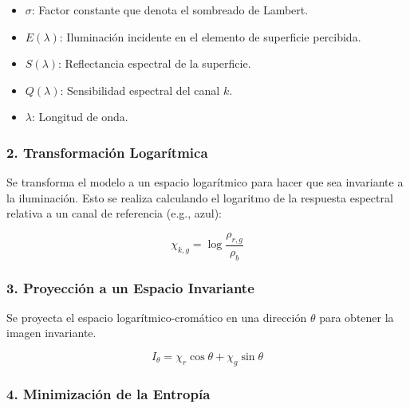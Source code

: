 \begin{itemize}
\setlength{\itemsep}{-1ex}
   \item{\begin{flushleft} $\sigma$: Factor constante que denota el sombreado de Lambert. \end{flushleft}}
   \item{\begin{flushleft} $E(\lambda )$: Iluminación incidente en el elemento de superficie percibida. \end{flushleft}}
   \item{\begin{flushleft} $S(\lambda )$: Reflectancia espectral de la superficie. \end{flushleft}}
   \item{\begin{flushleft} $Q(\lambda )$: Sensibilidad espectral del canal $k$. \end{flushleft}}
   \item{\begin{flushleft} $\lambda$: Longitud de onda. \end{flushleft}}
\end{itemize}

\subsubsection{2. Transformación Logarítmica}

Se transforma el modelo a un espacio logarítmico para hacer que sea invariante a la iluminación. Esto se realiza calculando el logaritmo de la respuesta espectral relativa a un canal de referencia (e.g., azul):

$$\chi_{k,g} =\log \frac{\rho_{r,g} }{\rho_b }$$

\subsubsection{3. Proyección a un Espacio Invariante}

Se proyecta el espacio logarítmico-cromático en una dirección $\theta$ para obtener la imagen invariante.

$$I_{\theta } =\chi_r \cos \theta +\chi_g \sin \theta$$

\subsubsection{4. Minimización de la Entropía}

